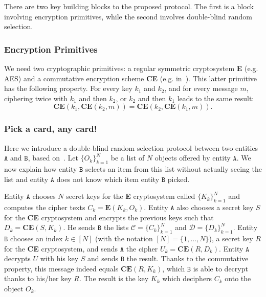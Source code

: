 \documentclass{article}
\begin{document}
There are two key building blocks to the proposed protocol.  The first
is a block involving encryption primitives, while the second involves
double-blind random selection.

\subsubsection{Encryption Primitives}
We need two cryptographic primitives: a regular symmetric cryptosystem
\textbf{E} (e.g. AES) and a commutative encryption scheme \textbf{CE}
(e.g. in~\cite{bao_icisc_00,bao_icics_01}). This latter
primitive has the following property. For every key $k_1$ and $k_2$, and
for every message $m$, ciphering twice with $k_1$ and then $k_2$, or
$k_2$ and then $k_1$ leads to the same result:
\begin{equation}
 \textbf{CE}(k_1, \textbf{CE}(k_2,m)) = \textbf{CE}(k_2, \textbf{CE}(k_1,m)).
\end{equation}

\subsubsection{Pick a card, any card!}
\label{subsec:card}

Here we introduce a double-blind random selection protocol between two entities $\mathtt{A}$ and $\mathtt{B}$, based on~\cite{bao_icisc_00}. 
Let $\{O_k\}_{k=1}^{N}$ be a list of $N$ objects offered by
entity $\mathtt{A}$. We now explain how entity $\mathtt{B}$
selects an item from this list without actually seeing the list and
entity $\mathtt{A}$ does not know which item entity $\mathtt{B}$ picked.

Entity $\mathtt{A}$ chooses $N$ secret keys for the \textbf{E} cryptosystem
called $\{K_k\}_{k=1}^{N}$ and computes the cipher texts
$C_{k}=\textbf{E}(K_k, O_k)$.  {Entity} $\mathtt{A}$ also chooses a secret key
$S$ for the \textbf{CE} cryptosystem and encrypts the previous keys such that
$D_{k}=\textbf{CE}(S,K_{k})$.  He sends $\mathtt{B}$ the lists
$\mathcal{C}=\{C_{k}\}_{k=1}^{N}$ and
$\mathcal{D}=\{D_{k}\}_{k=1}^{N}$.  {Entity} $\mathtt{B}$ chooses an index
$k\in[N]$ (with the notation $[N]=\{1,\ldots,N\}$), a secret key $R$
for the \textbf{CE} cryptosystem, and sends $\mathtt{A}$ the cipher
$U_k=\textbf{CE}(R,D_{k})$.  Entity $\mathtt{A}$ decrypts $U$ with his key $S$
and sends $\mathtt{B}$ the result. Thanks to the commutative property,
this message indeed equals $\textbf{CE}(R,K_{k})$, which $\mathtt{B}$
is able to decrypt thanks to his/her key $R$. The result is the key
$K_{k}$ which deciphers $C_{k}$ onto the object $O_{k}$.
\end{document}
